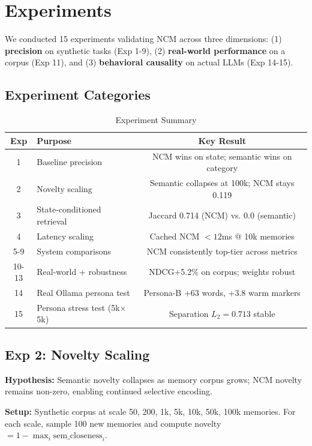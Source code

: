 \documentclass[10pt,twocolumn,letterpaper]{article}
\begin{document}
\section{Experiments}
\label{sec:experiments}

We conducted 15 experiments validating NCM across three dimensions: (1) \textbf{precision} on synthetic tasks (Exp 1-9), (2) \textbf{real-world performance} on a corpus (Exp 11), and (3) \textbf{behavioral causality} on actual LLMs (Exp 14-15).

\subsection{Experiment Categories}

\begin{table}[t]
\centering
\small
\begin{tabular}{|c|l|c|}
\hline
\textbf{Exp} & \textbf{Purpose} & \textbf{Key Result} \\
\hline
1 & Baseline precision & NCM wins on state; semantic wins on category \\
2 & Novelty scaling & Semantic collapses at 100k; NCM stays 0.119 \\
3 & State-conditioned retrieval & Jaccard 0.714 (NCM) vs. 0.0 (semantic) \\
4 & Latency scaling & Cached NCM $< 12$ms @ 10k memories \\
5-9 & System comparisons & NCM consistently top-tier across metrics \\
10-13 & Real-world + robustness & NDCG+5.2\% on corpus; weights robust \\
14 & Real Ollama persona test & Persona-B +63 words, +3.8 warm markers \\
15 & Persona stress test (5k$\times$5k) & Separation $L_2=0.713$ stable \\
\hline
\end{tabular}
\caption{Experiment Summary}
\label{table:experiments}
\end{table}

\subsection{Exp 2: Novelty Scaling}

\textbf{Hypothesis:} Semantic novelty collapses as memory corpus grows; NCM novelty remains non-zero, enabling continued selective encoding.

\textbf{Setup:} Synthetic corpus at scale 50, 200, 1k, 5k, 10k, 50k, 100k memories. For each scale, sample 100 new memories and compute novelty $= 1 - \max_i \text{sem\_closeness}_i$.
\end{document}
